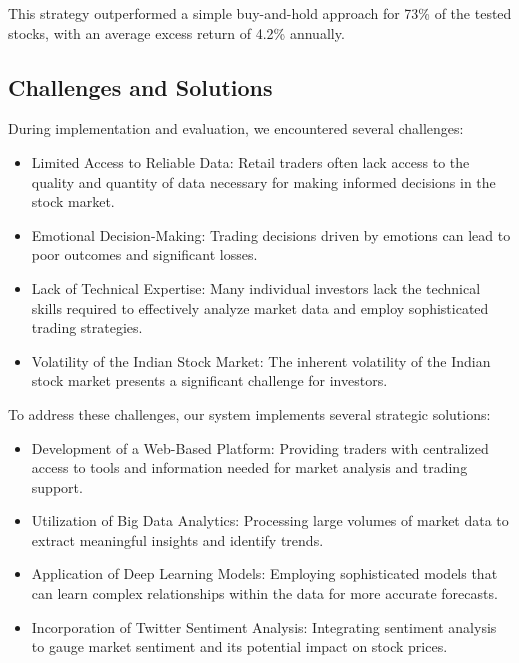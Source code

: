 \documentclass[conference]{IEEEtran}
\begin{document}
This strategy outperformed a simple buy-and-hold approach for 73\% of the tested stocks, with an average excess return of 4.2\% annually.

\subsection{Challenges and Solutions}
During implementation and evaluation, we encountered several challenges:

\begin{itemize}
\item Limited Access to Reliable Data: Retail traders often lack access to the quality and quantity of data necessary for making informed decisions in the stock market.

\item Emotional Decision-Making: Trading decisions driven by emotions can lead to poor outcomes and significant losses.

\item Lack of Technical Expertise: Many individual investors lack the technical skills required to effectively analyze market data and employ sophisticated trading strategies.

\item Volatility of the Indian Stock Market: The inherent volatility of the Indian stock market presents a significant challenge for investors.
\end{itemize}

To address these challenges, our system implements several strategic solutions:

\begin{itemize}
\item Development of a Web-Based Platform: Providing traders with centralized access to tools and information needed for market analysis and trading support.

\item Utilization of Big Data Analytics: Processing large volumes of market data to extract meaningful insights and identify trends.

\item Application of Deep Learning Models: Employing sophisticated models that can learn complex relationships within the data for more accurate forecasts.

\item Incorporation of Twitter Sentiment Analysis: Integrating sentiment analysis to gauge market sentiment and its potential impact on stock prices.
\end{itemize}
\end{document}
